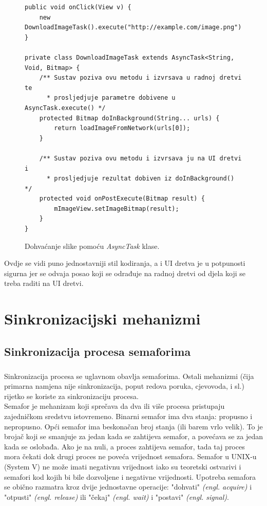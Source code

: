 \documentclass[times, utf8, zavrsni]{fer}
\begin{document}
\begin{figure}[ht!]
\begin{lstlisting}
public void onClick(View v) {
    new DownloadImageTask().execute("http://example.com/image.png");
}

private class DownloadImageTask extends AsyncTask<String, Void, Bitmap> {
    /** Sustav poziva ovu metodu i izvrsava u radnoj dretvi te
      * prosljedjuje parametre dobivene u AsyncTask.execute() */
    protected Bitmap doInBackground(String... urls) {
        return loadImageFromNetwork(urls[0]);
    }

    /** Sustav poziva ovu metodu i izvrsava ju na UI dretvi i
      * prosljedjuje rezultat dobiven iz doInBackground() */
    protected void onPostExecute(Bitmap result) {
        mImageView.setImageBitmap(result);
    }
}
\end{lstlisting}
\caption{Dohvaćanje slike pomoću \textit{AsyncTask} klase.}
\label{overflow}
\end{figure}

Ovdje se vidi puno jednostavniji stil kodiranja, a i UI dretva je u potpunosti sigurna jer se odvaja posao koji se odrađuje na radnoj dretvi od djela koji se treba raditi na UI dretvi.\newpage

\chapter{Sinkronizacijski mehanizmi}
\section{Sinkronizacija procesa semaforima}
\paragraph{}
Sinkronizacija procesa se uglavnom obavlja semaforima. Ostali mehanizmi (čija primarna namjena nije sinkronizacija, poput redova poruka, cjevovoda, i sl.) rijetko se koriste za sinkronizaciju procesa.\\

Semafor je mehanizam koji sprečava da dva ili više procesa pristupaju zajedničkom sredstvu istovremeno. Binarni semafor ima dva stanja: propusno i nepropusno. Opći semafor ima beskonačan broj stanja (ili barem vrlo velik). To je brojač koji se smanjuje za jedan kada se zahtijeva semafor, a povećava se za jedan kada se oslobađa. Ako je na nuli, a proces zahtijeva semafor, tada taj proces mora čekati dok drugi proces ne poveća vrijednost semafora. Semafor u UNIX-u (System V) ne može imati negativnu vrijednost iako su teoretski ostvarivi i semafori kod kojih bi bile dozvoljene i negativne vrijednosti. Upotreba semafora se obično razmatra kroz dvije jednostavne operacije: "dohvati" \textit{(engl. acquire)} i "otpusti" \textit{(engl. release)} ili "čekaj" \textit{(engl. wait)} i "postavi" \textit{(engl. signal)}.\\
\end{document}
